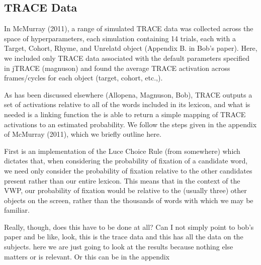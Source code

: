 \documentclass{article}
\begin{document}
\subsection{TRACE Data}

In McMurray (2011), a range of simulated TRACE data was collected across the space of hyperparameters, each simulation containing 14 trials, each with a Target, Cohort, Rhyme, and Unrelatd object (Appendix B. in Bob's paper). Here, we included only TRACE data associated with the default parameters specified in jTRACE (magnuson) and found the average TRACE activation across frames/cycles for each object (target, cohort, etc.,).

As has been discussed elsewhere (Allopena, Magnuson, Bob), TRACE outputs a set of activations relative to all of the words included in its lexicon, and what is needed is a linking function the is able to return a simple mapping of TRACE activations to an estimated probability. We follow the steps given in the appendix of McMurray (2011), which we briefly outline here. 

First is an implementation of the Luce Choice Rule (from somewhere) which dictates that, when considering the probability of fixation of a candidate word, we need only consider the probability of fixation relative to the other candidates present rather than our entire lexicon. This means that in the context of the VWP, our probability of fixation would be relative to the (usually three) other objects on the screen, rather than the thousands of words with which we may be familiar.  

Really, though, does this have to be done at all? Can I not simply point to bob's paper and be like, look, this is the trace data and this has all the data on the subjects. here we are just going to look at the results because nothing else matters or is relevant. Or this can be in the appendix
\end{document}
